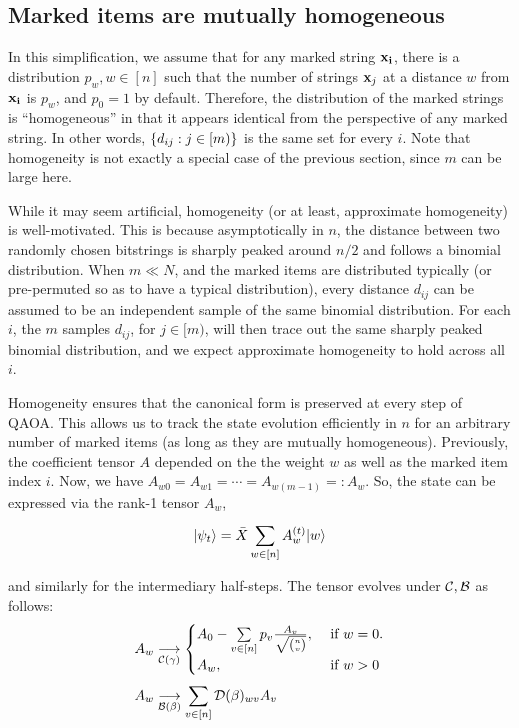 \documentclass[11pt]{article}
\begin{document}
\subsection{Marked items are mutually homogeneous}
\label{sec:hom}


In this simplification, we assume that for any marked string $\mathbf{x_i}$, there is a distribution $p_w, w\in [n]$ such that the number of strings $\mathbf{x}_j$ at a distance $w$ from $\mathbf{x_i}$ is $p_w$, and $p_0=1$ by default. Therefore, the distribution of the marked strings is ``homogeneous'' in that it appears identical from the perspective of any marked string. In other words, $\left\{d_{ij}: j\in[m)\right\}$ is the same set for every $i$. Note that homogeneity is not exactly a special case of the previous section, since $m$ can be large here.

While it may seem artificial, homogeneity (or at least, approximate homogeneity) is well-motivated. This is because asymptotically in $n$, the distance between two randomly chosen bitstrings is sharply peaked around $n/2$ and follows a binomial distribution. When $m \ll N$, and the marked items are distributed typically (or pre-permuted so as to have a typical distribution), every distance $d_{ij}$ can be assumed to be an independent sample of the same binomial distribution. For each $i$, the $m$ samples $d_{ij}$, for $j\in [m)$, will then trace out the same sharply peaked binomial distribution, and we expect approximate homogeneity to hold across all $i$.

Homogeneity ensures that the canonical form is preserved at every step of QAOA. This allows us to track the state evolution efficiently in $n$ for an arbitrary number of marked items (as long as they are mutually homogeneous). Previously, the coefficient tensor $A$ depended on the the weight $w$ as well as the marked item index $i$. Now, we have $A_{w0} = A_{w1} = \cdots = A_{w (m-1)} =: A_w$. So, the state can be expressed via the rank-1 tensor $A_w$,
\begin{equation}
  |\psi_t\rangle = \bar{X}\sum\limits_{w\in[n]}^{}A^{(t)}_w|w\rangle
\end{equation}

and similarly for the intermediary half-steps. The tensor evolves under $\mathcal{C}, \mathcal{B}$ as follows:
\begin{align}
  A_{w} &\underset{\mathcal{C}\left(\gamma\right)}{\longrightarrow}
  \begin{cases}
    A_{0} - \sum\limits_{v\in [n]}^{}p_v\frac{A_v}{\sqrt{\binom{n}{v}}}, &\text{ if } w=0.\\
    A_{w}, &\text{ if } w>0
  \end{cases}\\
 A_{w} &\underset{\mathcal{B}\left(\beta\right)}{\longrightarrow} \sum\limits_{v\in [n]}^{}\mathcal{D}(\beta)_{wv}A_{v}
\end{align}
\end{document}
